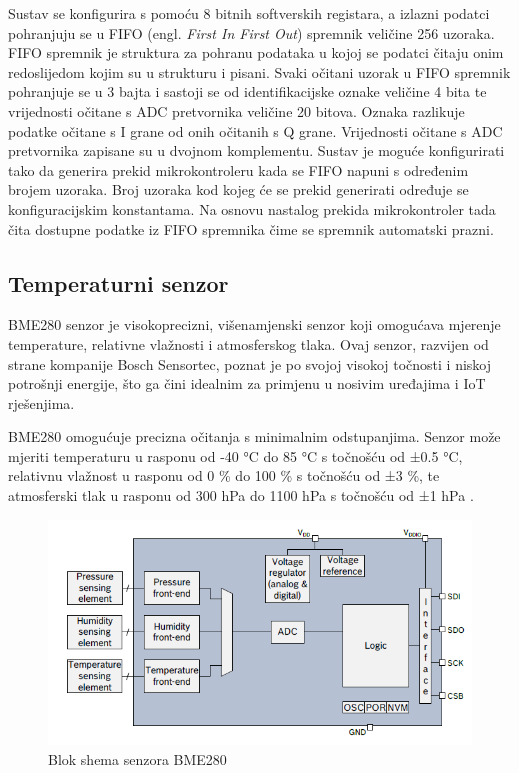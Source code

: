 \documentclass[../diplomski_rad.tex]{subfiles}
\begin{document}
Sustav se konfigurira s pomoću 8 bitnih softverskih registara, a izlazni podatci pohranjuju se u 
FIFO (engl. \textit{First In First Out}) spremnik veličine 256 uzoraka.
FIFO spremnik je struktura za pohranu podataka u kojoj se podatci čitaju onim redoslijedom kojim su u strukturu i pisani. 
Svaki očitani uzorak u FIFO spremnik pohranjuje se u 3 bajta i sastoji se od identifikacijske oznake veličine 4 bita te vrijednosti očitane s ADC 
pretvornika veličine 20 bitova. 
Oznaka razlikuje podatke očitane s I grane od onih očitanih s Q grane.
Vrijednosti očitane s ADC pretvornika zapisane su u dvojnom komplementu. 
Sustav je moguće konfigurirati tako da generira prekid mikrokontroleru kada se FIFO napuni s određenim brojem uzoraka. 
Broj uzoraka kod kojeg će se prekid generirati određuje se konfiguracijskim konstantama. Na osnovu nastalog prekida 
mikrokontroler tada čita dostupne podatke iz FIFO spremnika čime se spremnik automatski prazni.  

\subsection{Temperaturni senzor}

BME280 senzor je visokoprecizni, višenamjenski senzor koji omogućava mjerenje temperature, 
relativne vlažnosti i atmosferskog tlaka. 
Ovaj senzor, razvijen od strane kompanije Bosch Sensortec, poznat je po svojoj visokoj točnosti i 
niskoj potrošnji energije, što ga čini idealnim za primjenu u nosivim uređajima i IoT rješenjima.

BME280 omogućuje precizna očitanja s minimalnim odstupanjima. 
Senzor može mjeriti temperaturu u rasponu od -40 °C do 85 °C s točnošću od ±0.5 °C, 
relativnu vlažnost u rasponu od 0 \% do 100 \% s točnošću od ±3 \%, te atmosferski tlak u 
rasponu od 300 hPa do 1100 hPa s točnošću od ±1 hPa \cite{bme280_datasheet}.

\begin{figure}[htb]
    \centering
    \includegraphics[width=1\textwidth]{Figures/bme280.png} 
    \caption{Blok shema senzora BME280\cite{bme280_datasheet}}
    \label{slk:shema_bme280}
\end{figure}
\end{document}
